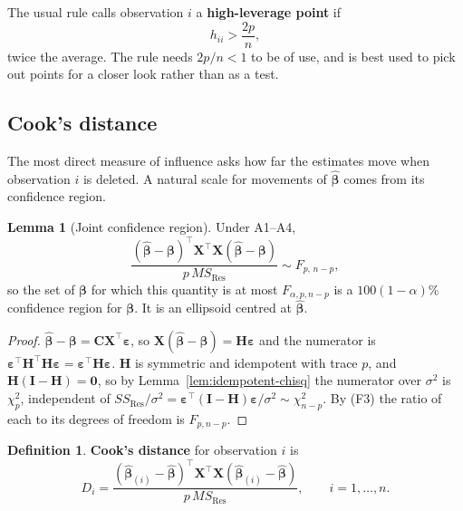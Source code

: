 \documentclass[11pt,a4paper]{article}
\numberwithin{equation}{section}
\theoremstyle{definition}
\newtheorem{defn}[thm]{Definition}
\newtheorem{lem}[thm]{Lemma}
\begin{document}
The usual rule calls observation $i$ a \textbf{high-leverage point} if
\[
h_{ii} > \frac{2p}{n} ,
\]
twice the average. The rule needs $2p/n < 1$ to be of use, and is best used to pick out
points for a closer look rather than as a test.

\subsection{Cook's distance}
The most direct measure of influence asks how far the estimates move when observation $i$
is deleted. A natural scale for movements of $\hat{\boldsymbol\beta}$ comes from its
confidence region.

\begin{lem}[Joint confidence region]\label{lem:conf-region}
Under A1--A4,
\[
\frac{(\hat{\boldsymbol\beta} - \boldsymbol\beta)^\top\mathbf{X}^\top\mathbf{X}(\hat{\boldsymbol\beta} - \boldsymbol\beta)}{p\,MS_{\mathrm{Res}}} \sim F_{p,\, n - p} ,
\]
so the set of $\boldsymbol\beta$ for which this quantity is at most $F_{\alpha, p, n - p}$ is a
$100(1 - \alpha)\%$ confidence region for $\boldsymbol\beta$. It is an ellipsoid centred at
$\hat{\boldsymbol\beta}$.
\end{lem}

\begin{proof}
$\hat{\boldsymbol\beta} - \boldsymbol\beta = \mathbf{C}\mathbf{X}^\top\boldsymbol\varepsilon$, so
$\mathbf{X}(\hat{\boldsymbol\beta} - \boldsymbol\beta) = \mathbf{H}\boldsymbol\varepsilon$ and the
numerator is $\boldsymbol\varepsilon^\top\mathbf{H}^\top\mathbf{H}\boldsymbol\varepsilon = \boldsymbol\varepsilon^\top\mathbf{H}\boldsymbol\varepsilon$.
$\mathbf{H}$ is symmetric and idempotent with trace $p$, and $\mathbf{H}(\mathbf{I} - \mathbf{H}) = \mathbf{0}$,
so by Lemma~\ref{lem:idempotent-chisq} the numerator over $\sigma^2$ is $\chi^2_p$,
independent of $SS_{\mathrm{Res}}/\sigma^2 = \boldsymbol\varepsilon^\top(\mathbf{I} - \mathbf{H})\boldsymbol\varepsilon/\sigma^2 \sim \chi^2_{n - p}$.
By (F3) the ratio of each to its degrees of freedom is $F_{p, n - p}$.
\end{proof}

\begin{defn}
\textbf{Cook's distance} for observation $i$ is
\[
D_i = \frac{(\hat{\boldsymbol\beta}_{(i)} - \hat{\boldsymbol\beta})^\top\mathbf{X}^\top\mathbf{X}(\hat{\boldsymbol\beta}_{(i)} - \hat{\boldsymbol\beta})}{p\,MS_{\mathrm{Res}}} ,
\qquad i = 1, \dots, n .
\]
\end{defn}
\end{document}
